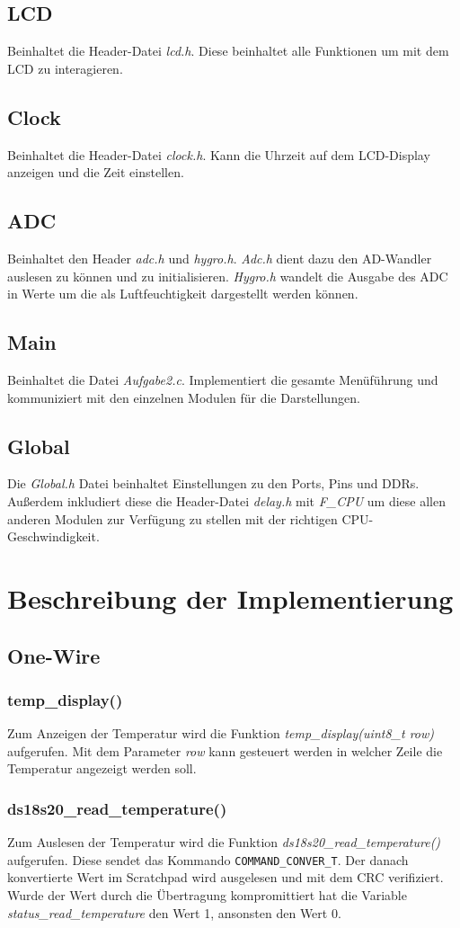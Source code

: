 \documentclass[10pt]{scrartcl}
\begin{document}
\subsection{LCD}
Beinhaltet die Header-Datei \textit{lcd.h}. Diese beinhaltet alle Funktionen um mit dem LCD zu interagieren.
\subsection{Clock}
Beinhaltet die Header-Datei \textit{clock.h}. Kann die Uhrzeit auf dem LCD-Display anzeigen und die Zeit einstellen.
\subsection{ADC}
Beinhaltet den Header \textit{adc.h} und \textit{hygro.h}. \textit{Adc.h} dient dazu den AD-Wandler auslesen zu können und zu initialisieren. \textit{Hygro.h} wandelt die Ausgabe des ADC in Werte um die als Luftfeuchtigkeit dargestellt werden können.
\subsection{Main}
Beinhaltet die Datei \textit{Aufgabe2.c}. Implementiert die gesamte Menüführung und kommuniziert mit den einzelnen Modulen für die Darstellungen.
\subsection{Global}
Die \textit{Global.h} Datei beinhaltet Einstellungen zu den Ports, Pins und DDRs. Außerdem inkludiert diese die Header-Datei \textit{delay.h} mit \textit{F\_CPU} um diese allen anderen Modulen zur Verfügung zu stellen mit der richtigen CPU-Geschwindigkeit.
\section{Beschreibung der Implementierung}
\subsection{One-Wire}
\subsubsection{temp\_display()}
Zum Anzeigen der Temperatur wird die Funktion \textit{temp\_display(uint8\_t row)} aufgerufen. Mit dem Parameter \textit{row} kann gesteuert werden in welcher Zeile die Temperatur angezeigt werden soll.
\subsubsection{ds18s20\_read\_temperature()}
Zum Auslesen der Temperatur wird die Funktion \textit{ds18s20\_read\_temperature()} aufgerufen. Diese sendet das Kommando \texttt{COMMAND\_CONVER\_T}. Der danach konvertierte Wert im Scratchpad wird ausgelesen und mit dem CRC verifiziert. Wurde der Wert durch die Übertragung kompromittiert hat die Variable \textit{status\_read\_temperature} den Wert 1, ansonsten den Wert 0.
\end{document}
